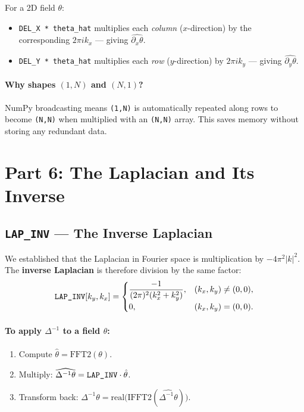 \documentclass[12pt,a4paper]{article}
\newcommand{\lapinv}{\Delta^{-1}}
\newcommand{\code}[1]{\texttt{#1}}
\newcommand{\LAPINV}{\text{\texttt{LAP\_INV}}}
\theoremstyle{definition}
\begin{document}
For a 2D field $\theta$:
\begin{itemize}
  \item \code{DEL\_X * theta\_hat} multiplies each \emph{column}
    ($x$-direction) by the corresponding $2\pi ik_x$ — giving
    $\widehat{\partial_x\theta}$.
  \item \code{DEL\_Y * theta\_hat} multiplies each \emph{row}
    ($y$-direction) by $2\pi ik_y$ — giving $\widehat{\partial_y\theta}$.
\end{itemize}

\paragraph{Why shapes $(1,N)$ and $(N,1)$?}
NumPy broadcasting means \code{(1,N)} is automatically repeated along rows to
become \code{(N,N)} when multiplied with an \code{(N,N)} array.  This saves
memory without storing any redundant data.

\section{Part 6: The Laplacian and Its Inverse}

\subsection{\code{LAP\_INV} — The Inverse Laplacian}

We established that the Laplacian in Fourier space is multiplication by
$-4\pi^2|k|^2$.  The \textbf{inverse Laplacian} is therefore division by the
same factor:
\begin{equation}
  \LAPINV[k_y,k_x]
  = \begin{cases}
      \dfrac{-1}{(2\pi)^2(k_x^2+k_y^2)}, & (k_x,k_y)\neq(0,0),\\[6pt]
      0, & (k_x,k_y)=(0,0).
    \end{cases}
\end{equation}

\paragraph{To apply $\lapinv$ to a field $\theta$:}
\begin{enumerate}
  \item Compute $\hat\theta = \mathrm{FFT2}(\theta)$.
  \item Multiply: $\widehat{\lapinv\theta} = \LAPINV\cdot\hat\theta$.
  \item Transform back: $\lapinv\theta = \mathrm{real}
    \bigl(\mathrm{IFFT2}(\widehat{\lapinv\theta})\bigr)$.
\end{enumerate}
\end{document}
